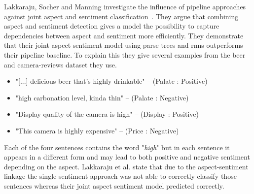 Lakkaraju, Socher and Manning investigate the influence of pipeline approaches against joint aspect and sentiment classification~\cite{Lakkaraju2014}. They argue that combining aspect and sentiment detection gives a model the possibility to capture dependencies between aspect and sentiment more efficiently. They demonstrate that their joint aspect sentiment model using parse trees and \glspl{rnn} outperforms their pipeline baseline. To explain this they give several examples from the beer~\cite{McAuley2012, McAuley2013b} and camera-reviews dataset they use. 

\begin{itemize}
	\item "{[...]} delicious beer that’s highly drinkable" -- {(Palate : Positive)}
	\item "high carbonation level, kinda thin" -- {(Palate : Negative)}
	\item "Display quality of the camera is high" -- {(Display : Positive)}
	\item "This camera is highly expensive" -- {(Price : Negative)}
\end{itemize}

Each of the four sentences contains the word "\textit{high}" but in each sentence it appears in a different form and may lead to both positive and negative sentiment depending on the aspect. Lakkaraju et al. state that due to the aspect-sentiment linkage the single sentiment approach was not able to correctly classify those sentences whereas their joint aspect sentiment model predicted correctly.
\medskip


